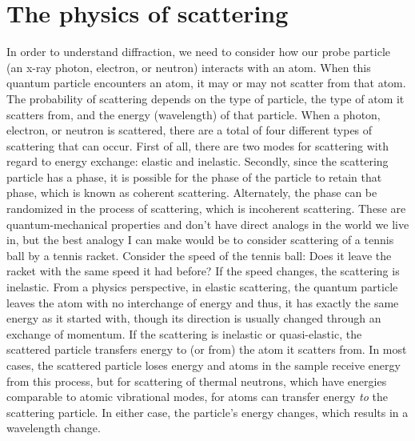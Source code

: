 \section{The physics of scattering}

In order to understand diffraction, we need to consider how our probe particle (an x-ray photon, electron, or neutron) interacts with an atom. 
When this quantum particle encounters an atom, it may or may not scatter from that atom. The probability of scattering depends on the type of particle, the type of atom it scatters from, and the energy (wavelength) of that particle. When a photon, electron, or neutron is scattered, there are a total of four different types of scattering that can occur. First of all, there are two modes for scattering with regard to energy exchange: elastic and inelastic. Secondly, since the scattering particle has a phase, it is possible for the phase of the particle to retain that phase, which is known as coherent scattering. Alternately, the phase can be randomized in the process of scattering, which is incoherent scattering. These are quantum-mechanical properties and don't have direct analogs in the world we live in, but the best analogy I can make would be to consider scattering of a tennis ball by a tennis racket. Consider the speed of the tennis ball: Does it leave the racket with the same speed it had before? If the speed changes, the scattering is inelastic. From a physics perspective, in elastic scattering, the quantum particle leaves the atom with no interchange of energy and thus, it has exactly the same energy as it started with, though its direction is usually changed through an exchange of momentum. If the scattering is inelastic or quasi-elastic, the scattered particle transfers energy to (or from) the atom it scatters from. In most cases, the scattered particle loses energy and atoms in the sample receive energy from this process, but for scattering of thermal neutrons, which have energies comparable to atomic vibrational modes, for atoms can transfer energy \textit{to} the scattering particle. In either case, the particle’s energy changes, which results in a wavelength change. 

